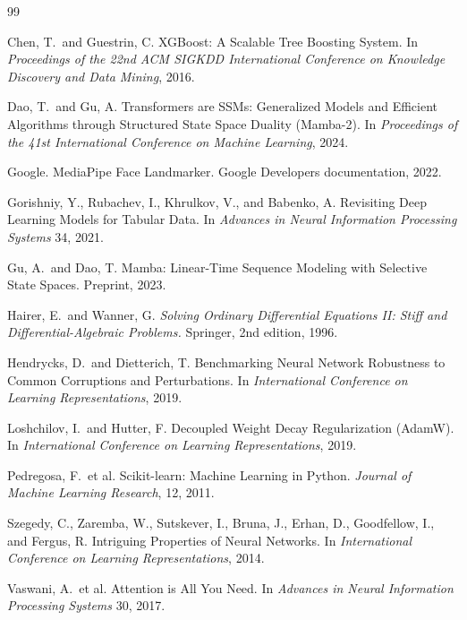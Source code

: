 \documentclass{article}
\begin{document}
\begin{thebibliography}{99}

Chen, T.\ and Guestrin, C.
XGBoost: A Scalable Tree Boosting System.
In \emph{Proceedings of the 22nd ACM SIGKDD International Conference on Knowledge Discovery and Data Mining}, 2016.

Dao, T.\ and Gu, A.
Transformers are SSMs: Generalized Models and Efficient Algorithms through Structured State Space Duality (Mamba-2).
In \emph{Proceedings of the 41st International Conference on Machine Learning}, 2024.

Google.
MediaPipe Face Landmarker.
Google Developers documentation, 2022.

Gorishniy, Y., Rubachev, I., Khrulkov, V., and Babenko, A.
Revisiting Deep Learning Models for Tabular Data.
In \emph{Advances in Neural Information Processing Systems} 34, 2021.

Gu, A.\ and Dao, T.
Mamba: Linear-Time Sequence Modeling with Selective State Spaces.
Preprint, 2023.

Hairer, E.\ and Wanner, G.
\emph{Solving Ordinary Differential Equations II: Stiff and Differential-Algebraic Problems.}
Springer, 2nd edition, 1996.

Hendrycks, D.\ and Dietterich, T.
Benchmarking Neural Network Robustness to Common Corruptions and Perturbations.
In \emph{International Conference on Learning Representations}, 2019.

Loshchilov, I.\ and Hutter, F.
Decoupled Weight Decay Regularization (AdamW).
In \emph{International Conference on Learning Representations}, 2019.

Pedregosa, F.\ et al.
Scikit-learn: Machine Learning in Python.
\emph{Journal of Machine Learning Research}, 12, 2011.

Szegedy, C., Zaremba, W., Sutskever, I., Bruna, J., Erhan, D., Goodfellow, I., and Fergus, R.
Intriguing Properties of Neural Networks.
In \emph{International Conference on Learning Representations}, 2014.

Vaswani, A.\ et al.
Attention is All You Need.
In \emph{Advances in Neural Information Processing Systems} 30, 2017.

\end{thebibliography}
\end{document}
